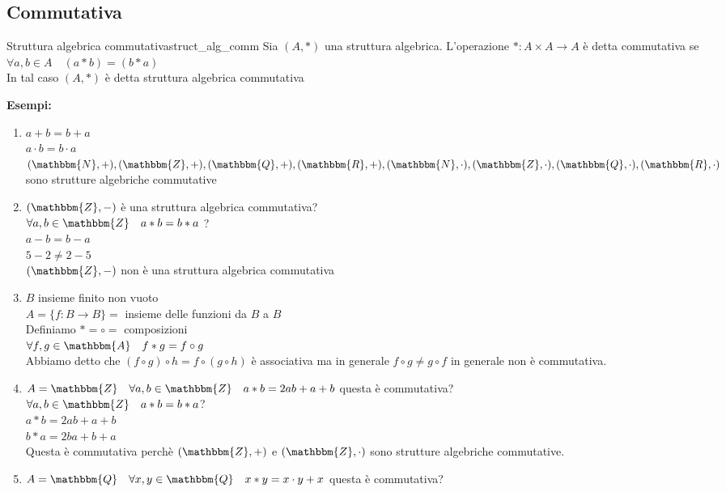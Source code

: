 \documentclass[12pt, letterpaper]{report}
\newcounter{definition}
\newcommand{\nmu}{}
\begin{document}
		\subsection{Commutativa}
		\begin{definition}{\nmu Struttura algebrica commutativa}{struct_alg_comm}
			Sia $(A, *)$ una struttura algebrica. L'operazione $*: A \times A\to A$ è detta commutativa se $\forall a,b \in A \quad (a * b) = (b * a)$ \\
			In tal caso $(A, *)$ è detta struttura algebrica commutativa
		\end{definition}
		\textbf{Esempi:}
		\begin{enumerate}
			\item $a+b = b +a$ \\
			$a\cdot b = b \cdot a$ \\
			$(\mathbbm{N}, +), (\mathbbm{Z}, +), (\mathbbm{Q}, +), (\mathbbm{R}, +), (\mathbbm{N}, \cdot), (\mathbbm{Z}, \cdot), (\mathbbm{Q}, \cdot), (\mathbbm{R}, \cdot)$ sono strutture algebriche commutative
			\item $(\mathbbm{Z}, -)$ è una struttura algebrica commutativa? \\
			$\forall a,b \in \mathbbm{Z} \quad a*b = b*a$ ? \\
			$a-b =b-a$ \\
			$5-2 \neq 2-5$ \\
			$(\mathbbm{Z}, -)$ non è una struttura algebrica commutativa
			\item $B$ insieme finito non vuoto \\
			$A=\{f:B \to B\}=$ insieme delle funzioni da $B$ a $B$ \\
			Definiamo $*=\circ=$ composizioni \\
			$\forall f,g \in \mathbbm{A} \quad f*g=f\circ g$  \\
			Abbiamo detto che $(f \circ g) \circ h = f \circ (g \circ h)$ è associativa ma in generale $f \circ g \neq g \circ f$ in generale non è commutativa.
			\item $A=\mathbbm{Z} \quad \forall a,b \in \mathbbm{Z} \quad a*b = 2ab + a +b$ questa è commutativa? \\
			$\forall a,b \in \mathbbm{Z} \quad a*b=b*a$? \\
			$a*b = 2ab + a + b$ \\
			$b*a = 2ba + b + a$ \\
			Questa è commutativa perchè $(\mathbbm{Z}, +)$ e $(\mathbbm{Z}, \cdot)$ sono strutture algebriche commutative.
			\item $A=\mathbbm{Q} \quad \forall x,y \in \mathbbm{Q} \quad x*y = x\cdot y + x$ questa è commutativa? \\

\end{enumerate}
\end{document}
